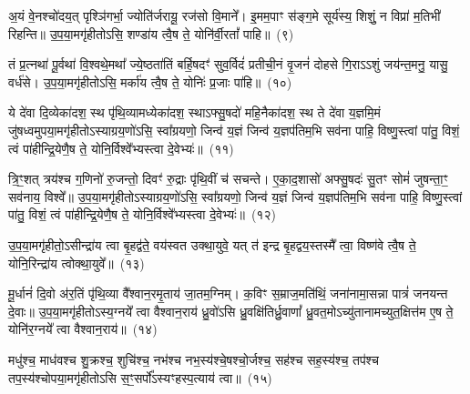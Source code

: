 {\anuvakamend[{प्रा॒त॒र्युजा॒वेका॒न्नविꣳ॑शतिः}]}

अ॒यं वे॒नश्चो॑दय॒त् पृश्ञि॑गर्भा॒ ज्योति॑र्जरायू॒ रज॑सो वि॒माने᳚। इ॒मम॒पाꣳ स॑ङ्ग॒मे सूर्य॑स्य॒ शिशुं॒ न विप्रा॑ म॒तिभी॑ रिहन्ति॥ उ॒प॒या॒मगृ॑हीतो\-ऽसि॒ शण्डा॑य त्वै॒ष ते॒ योनि॑र्वी॒रतां᳚ पाहि॥~(९)\ip

{\anuvakamend[{अ॒यं वे॒नः पञ्च॑विꣳशतिः}]}

तं प्र॒त्नथा॑ पू॒र्वथा॑ वि॒श्वथे॒मथा᳚ ज्ये॒ष्ठता॑तिं बर्\mbox{}हि॒षदꣳ॑ सुव॒र्विदं॑ प्रतीची॒नं वृ॒जनं॑ दोहसे गि॒रा\-ऽऽ\-शुं जय॑न्त॒मनु॒ यासु॒ वर्ध॑से। उ॒प॒या॒मगृ॑हीतो\-ऽसि॒ मर्का॑य त्वै॒ष ते॒ योनिः॑ प्र॒जाः पा॑हि॥~(१०)\ip

{\anuvakamend[{तꣳ षड्विꣳ॑शतिः}]}

ये दे॑वा दि॒व्येका॑\-दश॒ स्थ पृ॑थि॒व्यामध्येका॑\-दश॒ स्था\-ऽफ्सु॒षदो॑ महि॒नैका॑\-दश॒ स्थ ते दे॑वा य॒ज्ञमि॒मं जु॑षध्वमुपया॒मगृ॑हीतो\-ऽस्याग्रय॒णो॑\-ऽसि॒ स्वा᳚ग्रयणो॒ जिन्व॑ य॒ज्ञं जिन्व॑ य॒ज्ञप॑तिम॒भि सव॑ना पाहि॒ विष्णु॒स्त्वां पा॑तु॒ विशं॒ त्वं पा॑हीन्द्रि॒येणै॒ष ते॒ योनि॒र्विश्वे᳚भ्यस्त्वा दे॒वेभ्यः॑॥~(११)\ip

{\anuvakamend[{ये दे॑वा॒स्त्रिच॑त्वारिꣳशत्}]}%

त्रि॒ꣳ॒शत् त्रय॑श्च ग॒णिनो॑ रु॒जन्तो॒ दिवꣳ॑ रु॒द्राः पृ॑थि॒वीं च॑ सचन्ते। ए॒का॒द॒शासो॑ अफ्सु॒षदः॑ सु॒तꣳ सोमं॑ जुषन्ता॒ꣳ॒ सव॑नाय॒ विश्वे᳚॥ उ॒प॒या॒मगृ॑हीतो\-ऽस्याग्रय॒णो॑\-ऽसि॒ स्वा᳚ग्रयणो॒ जिन्व॑ य॒ज्ञं जिन्व॑ य॒ज्ञप॑तिम॒भि सव॑ना पाहि॒ विष्णु॒स्त्वां पा॑तु॒ विशं॒ त्वं पा॑हीन्द्रि॒येणै॒ष ते॒ योनि॒र्विश्वे᳚भ्यस्त्वा दे॒वेभ्यः॑॥~(१२)\ip

{\anuvakamend[{त्रि॒ꣳ॒शद् द्विच॑त्वारिꣳशत्}]}%

उ॒प॒या॒मगृ॑हीतो॒\-ऽसीन्द्रा॑य त्वा बृ॒हद्व॑ते॒ वय॑स्वत उक्था॒युवे॒ यत् त॑ इन्द्र बृ॒हद्वय॒स्तस्मै᳚ त्वा॒ विष्ण॑वे त्वै॒ष ते॒ योनि॒रिन्द्रा॑य त्वोक्था॒युवे᳚॥~(१३)\ip

{\anuvakamend[{उ॒प॒या॒मगृ॑हीतो॒ द्वाविꣳ॑शतिः}]}%

मू॒र्धानं॑ दि॒वो अ॑र॒तिं पृ॑थि॒व्या वै᳚श्वान॒रमृ॒ताय॑ जा॒तम॒ग्निम्। क॒विꣳ स॒म्राज॒मति॑थिं॒ जना॑नामा॒सन्ना पात्रं॑ जनयन्त दे॒वाः॥ उ॒प॒या॒मगृ॑हीतो\-ऽस्य॒ग्नये᳚ त्वा वैश्वान॒राय॑ ध्रु॒वो॑\-ऽसि ध्रु॒वक्षि॑तिर्ध्रु॒वाणां᳚ ध्रु॒वत॒मो\-ऽच्यु॑तानामच्युत॒क्षित्त॑म ए॒ष ते॒ योनि॑र॒ग्नये᳚ त्वा वैश्वान॒राय॑॥~(१४)\ip

{\anuvakamend[{मू॒र्धानं॒ पञ्च॑त्रिꣳशत्}]}%

मधु॑श्च॒ माध॑वश्च शु॒क्रश्च॒ शुचि॑श्च॒ नभ॑श्च नभ॒स्य॑श्चे॒षश्चो॒र्जश्च॒ सह॑श्च सह॒स्य॑श्च॒ तप॑श्च तप॒स्य॑श्चोपया॒मगृ॑हीतो\-ऽसि स॒ꣳ॒सर्पो᳚\-ऽस्यꣳहस्प॒त्याय॑ त्वा॥~(१५)\ip

